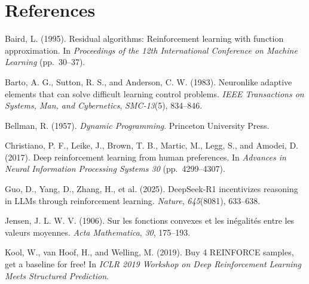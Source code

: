 \chapter*{References}

\begin{list}{}{%
  \setlength{\leftmargin}{1.6em}%
  \setlength{\itemindent}{-1.6em}%
  \setlength{\itemsep}{0.55em}%
  \setlength{\parsep}{0pt}%
  \setlength{\topsep}{0.6em}%
}

\item{}\label{cite:baird1995}%
Baird, L. (1995). Residual algorithms: Reinforcement learning with function approximation. In \textit{Proceedings of the 12th International Conference on Machine Learning} (pp.\ 30--37).

\item{}\label{cite:barto1983}%
Barto, A. G., Sutton, R. S., and Anderson, C. W. (1983). Neuronlike adaptive elements that can solve difficult learning control problems. \textit{IEEE Transactions on Systems, Man, and Cybernetics}, \textit{SMC-13}(5), 834--846.

\item{}\label{cite:bellman1957}%
Bellman, R. (1957). \textit{Dynamic Programming}. Princeton University Press.

\item{}\label{cite:christiano2017}%
Christiano, P. F., Leike, J., Brown, T. B., Martic, M., Legg, S., and Amodei, D. (2017). Deep reinforcement learning from human preferences. In \textit{Advances in Neural Information Processing Systems 30} (pp.\ 4299--4307).

\item{}\label{cite:deepseek2025}%
Guo, D., Yang, D., Zhang, H., et al. (2025). DeepSeek-R1 incentivizes reasoning in LLMs through reinforcement learning. \textit{Nature}, \textit{645}(8081), 633--638.

\item{}\label{cite:jensen1906}%
Jensen, J. L. W. V. (1906). Sur les fonctions convexes et les inégalités entre les valeurs moyennes. \textit{Acta Mathematica}, \textit{30}, 175--193.

\item{}\label{cite:kool2019}%
Kool, W., van Hoof, H., and Welling, M. (2019). Buy 4 REINFORCE samples, get a baseline for free! In \textit{ICLR 2019 Workshop on Deep Reinforcement Learning Meets Structured Prediction}.


\end{list}

